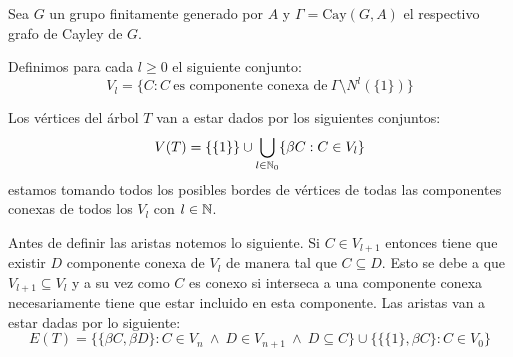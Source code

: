 \documentclass[tesis.tex]{subfiles}
\begin{document}
\begin{deff}
	\label{desc-grafo-cayley}
	
	Sea $G$ un grupo finitamente generado por $A$ y $\Gamma = \text{Cay}(G,A)$ el respectivo grafo de Cayley de $G$. 
	

	Definimos para cada $l \ge 0$ el siguiente conjunto:
	\[
			V_{l} = \{C : C \ \text{es componente conexa de} \ \Gamma \setminus N^{l}(\{1\})\}	
	\]
	
	Los vértices del árbol $T$ van a estar dados por los siguientes conjuntos:
	\[
			V(T) = \{ \{1\}\} \cup \bigcup_{l \in \mathbb{N}_{0}}  \{ \beta C : C \in V_{l} \}
	\]
	estamos tomando todos los posibles bordes de vértices 
	de todas las componentes conexas de todos los $V_l$ con $l \in \mathbb{N}$.
	 
	Antes de definir las aristas notemos lo siguiente.
	Si $C \in V_{l+1}$ entonces tiene que existir $D$ componente conexa de $V_{l}$ de manera tal que $C \subseteq D$.
	Esto se debe a que $V_{l+1} \subseteq V_{l}$ y a su vez como $C$ es conexo si interseca a una componente conexa necesariamente tiene que estar incluido en esta componente.
	Las aristas van a estar dadas por lo siguiente:
	\[
			E(T) = \{ \{\beta C, \beta D\} : C \in V_{n} \ \land \ D \in V_{n+1} \ \land \ D \subseteq C\} \cup 
			\{ \{\{1\}, \beta C\} : C \in V_{0} \}
	\]
	
	 
	
	

\end{deff}
\end{document}
